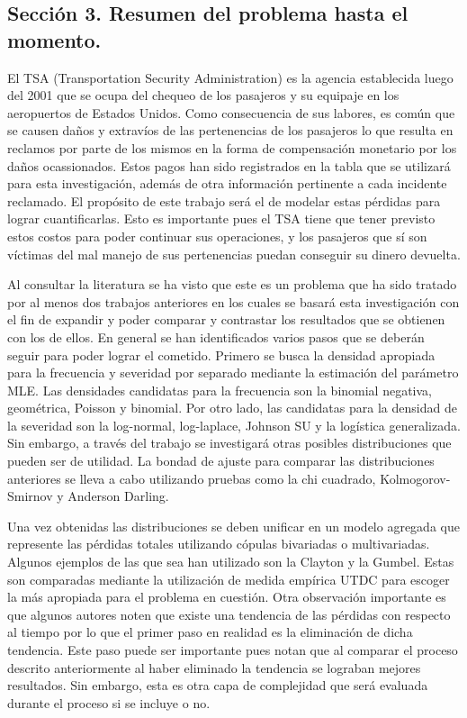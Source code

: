 \documentclass[
  letterpaper,
  onepage,
  openany]{scrreprt}
\begin{document}
\hypertarget{secciuxf3n-3.-resumen-del-problema-hasta-el-momento.}{%
\subsection{Sección 3. Resumen del problema hasta el
momento.}\label{secciuxf3n-3.-resumen-del-problema-hasta-el-momento.}}

El TSA (Transportation Security Administration) es la agencia
establecida luego del 2001 que se ocupa del chequeo de los pasajeros y
su equipaje en los aeropuertos de Estados Unidos. Como consecuencia de
sus labores, es común que se causen daños y extravíos de las
pertenencias de los pasajeros lo que resulta en reclamos por parte de
los mismos en la forma de compensación monetario por los daños
ocassionados. Estos pagos han sido registrados en la tabla que se
utilizará para esta investigación, además de otra información pertinente
a cada incidente reclamado. El propósito de este trabajo será el de
modelar estas pérdidas para lograr cuantificarlas. Esto es importante
pues el TSA tiene que tener previsto estos costos para poder continuar
sus operaciones, y los pasajeros que sí son víctimas del mal manejo de
sus pertenencias puedan conseguir su dinero devuelta.

Al consultar la literatura se ha visto que este es un problema que ha
sido tratado por al menos dos trabajos anteriores en los cuales se
basará esta investigación con el fin de expandir y poder comparar y
contrastar los resultados que se obtienen con los de ellos. En general
se han identificados varios pasos que se deberán seguir para poder
lograr el cometido. Primero se busca la densidad apropiada para la
frecuencia y severidad por separado mediante la estimación del parámetro
MLE. Las densidades candidatas para la frecuencia son la binomial
negativa, geométrica, Poisson y binomial. Por otro lado, las candidatas
para la densidad de la severidad son la log-normal, log-laplace, Johnson
SU y la logística generalizada. Sin embargo, a través del trabajo se
investigará otras posibles distribuciones que pueden ser de utilidad. La
bondad de ajuste para comparar las distribuciones anteriores se lleva a
cabo utilizando pruebas como la chi cuadrado, Kolmogorov-Smirnov y
Anderson Darling.

Una vez obtenidas las distribuciones se deben unificar en un modelo
agregada que represente las pérdidas totales utilizando cópulas
bivariadas o multivariadas. Algunos ejemplos de las que sea han
utilizado son la Clayton y la Gumbel. Estas son comparadas mediante la
utilización de medida empírica UTDC para escoger la más apropiada para
el problema en cuestión. Otra observación importante es que algunos
autores noten que existe una tendencia de las pérdidas con respecto al
tiempo por lo que el primer paso en realidad es la eliminación de dicha
tendencia. Este paso puede ser importante pues notan que al comparar el
proceso descrito anteriormente al haber eliminado la tendencia se
lograban mejores resultados. Sin embargo, esta es otra capa de
complejidad que será evaluada durante el proceso si se incluye o no.
\end{document}
